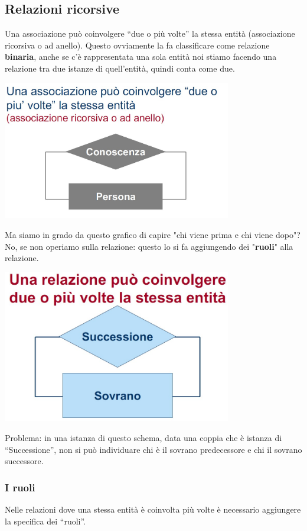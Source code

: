 \subsection{Relazioni ricorsive}
Una associazione può coinvolgere “due o più volte” la stessa entità (associazione ricorsiva o ad anello). Questo ovviamente la fa classificare come relazione \textbf{binaria}, anche se c'è rappresentata una sola entità noi stiamo facendo una relazione tra due istanze di quell'entità, quindi conta come due.
\begin{center}
    \includegraphics[width=0.75\textwidth]{chaptersLezioniSara/img/Relazioni_ricorsive1.jpg}
\end{center}
Ma siamo in grado da questo grafico di capire "chi viene prima e chi viene dopo"? No, se non operiamo sulla relazione: questo lo si fa aggiungendo dei "\textbf{ruoli}" alla relazione.
\begin{center}
    \includegraphics[width=0.75\textwidth]{chaptersLezioniSara/img/Relazioni_ricorsive2.jpg}
\end{center}
Problema: in una istanza di questo schema, data una coppia che è istanza di “Successione”, non si può individuare chi è il sovrano predecessore e chi il sovrano successore.
\subsubsection{I ruoli}
Nelle relazioni dove una stessa entità è coinvolta più volte è necessario aggiungere la specifica dei “ruoli”.

